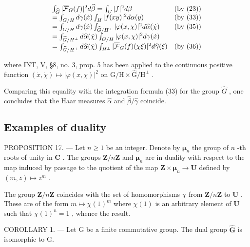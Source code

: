 \[
\begin{array}{l l} \int_ {\widehat {G}} | \overline {{\mathcal {F}}} _ {G} (f) | ^ {2} d \widehat {\beta} = \int_ {G} | f | ^ {2} d \beta & (\text {by (23)}) \\ = \int_ {G / H} d \gamma (\dot {x}) \int_ {H} | f (x y) | ^ {2} d \alpha (y) & (\text {by (33)}) \\ = \int_ {G / H} d \gamma (\dot {x}) \int_ {\widehat {G} / H ^ {\perp}} | \varphi (x, \chi) | ^ {2} d \widehat {\alpha} (\dot {\chi}) & (\text {by (35)}) \\ = \int_ {\widehat {G} / H ^ {\perp}} d \widehat {\alpha} (\dot {\chi}) \int_ {G / H} | \varphi (x, \chi) | ^ {2} d \gamma (\dot {x}) \\ = \int_ {\widehat {G} / H ^ {\perp}} d \widehat {\alpha} (\dot {\chi}) \int_ {H ^ {\perp}} | \overline {{\mathcal {F}}} _ {G} (f) (\chi \xi) | ^ {2} d \widehat {\gamma} (\xi) & (\text {by (36)}) \end{array}
\]

where INT, V, §8, no. 3, prop. 5 has been applied to the continuous positive function \((\dot{x},\dot{\chi})\mapsto |\varphi (x,\chi)|^{2}\) on \(\mathrm{G / H}\times \widehat{\mathrm{G}} /\mathrm{H}^{\perp}\) .

Comparing this equality with the integration formula (33) for the group \(\widehat{G}\) , one concludes that the Haar measures \(\widehat{\alpha}\) and \(\widehat{\beta}/\widehat{\gamma}\) coincide.

\subsection{Examples of duality}

PROPOSITION 17. --- Let \(n \geqslant 1\) be an integer. Denote by \(\boldsymbol{\mu}_{n}\) the group of \(n\) -th roots of unity in \(\mathbf{C}\) . The groups \(\mathbf{Z}/n\mathbf{Z}\) and \(\boldsymbol{\mu}_{n}\) are in duality with respect to the map induced by passage to the quotient of the map \(\mathbf{Z} \times \boldsymbol{\mu}_{n} \to \mathbf{U}\) defined by \((m,z) \mapsto z^{m}\) .

The group \(\mathbf{Z}/n\mathbf{Z}\) coincides with the set of homomorphisms \(\chi\) from \(\mathbf{Z}/n\mathbf{Z}\) to \(\mathbf{U}\) . These are of the form \(m \mapsto \chi(1)^m\) where \(\chi(1)\) is an arbitrary element of \(\mathbf{U}\) such that \(\chi(1)^n = 1\) , whence the result.

COROLLARY 1. --- Let G be a finite commutative group. The dual group \(\widehat{\mathbf{G}}\) is isomorphic to G.

